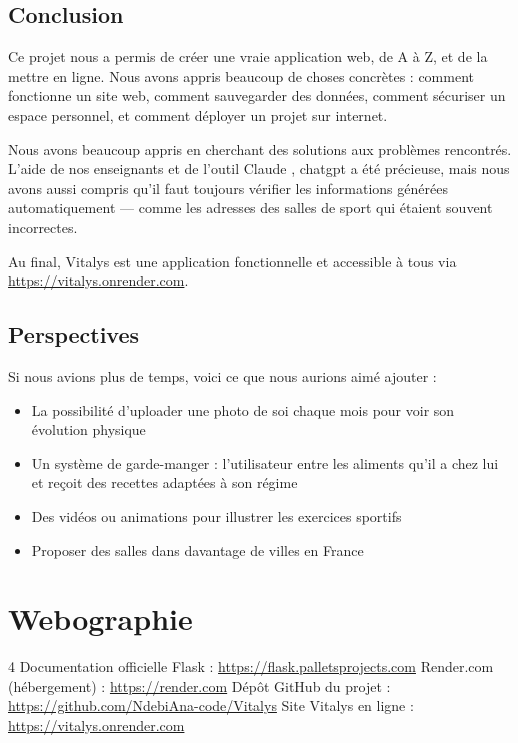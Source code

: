 \documentclass[a4paper, 12pt, twoside]{article}
\begin{document}
\subsection{Conclusion}

Ce projet nous a permis de créer une vraie application web, de A à Z, et de la mettre en ligne. Nous avons appris beaucoup de choses concrètes : comment fonctionne un site web, comment sauvegarder des données, comment sécuriser un espace personnel, et comment déployer un projet sur internet.

Nous avons beaucoup appris en cherchant des solutions aux problèmes rencontrés. L'aide de nos enseignants et de l'outil Claude , chatgpt  a été précieuse, mais nous avons aussi compris qu'il faut toujours vérifier les informations générées automatiquement — comme les adresses des salles de sport qui étaient souvent incorrectes.

Au final, Vitalys est une application fonctionnelle et accessible à tous via \url{https://vitalys.onrender.com}.

\subsection{Perspectives}

Si nous avions plus de temps, voici ce que nous aurions aimé ajouter :

\begin{itemize}
    \item La possibilité d'uploader une photo de soi chaque mois pour voir son évolution physique
    \item Un système de garde-manger : l'utilisateur entre les aliments qu'il a chez lui et reçoit des recettes adaptées à son régime
    \item Des vidéos ou animations pour illustrer les exercices sportifs
    \item Proposer des salles dans davantage de villes en France
\end{itemize}

\newpage
\section{Webographie}

\begin{thebibliography}{4}
    Documentation officielle Flask : \url{https://flask.palletsprojects.com}
    Render.com (hébergement) : \url{https://render.com}
    Dépôt GitHub du projet : \url{https://github.com/NdebiAna-code/Vitalys}
    Site Vitalys en ligne : \url{https://vitalys.onrender.com}
\end{thebibliography}
\end{document}
